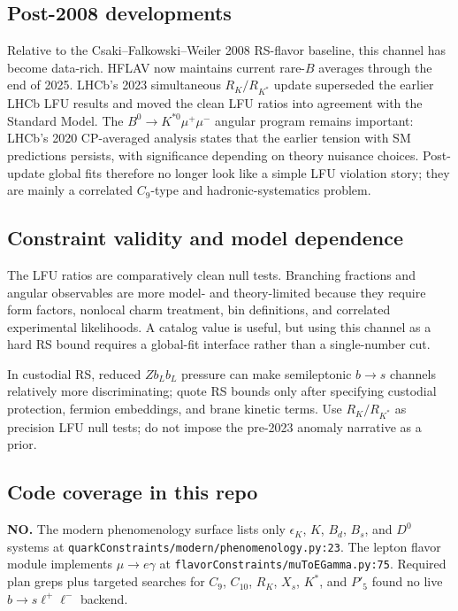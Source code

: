 \subsection*{Post-2008 developments}
Relative to the Csaki--Falkowski--Weiler 2008 RS-flavor baseline, this channel
has become data-rich.  HFLAV now maintains current rare-\(B\) averages through
the end of 2025.  LHCb's 2023 simultaneous \(R_K/R_{K^*}\) update superseded
the earlier LHCb LFU results and moved the clean LFU ratios into agreement with
the Standard Model.  The \(B^0\to K^{*0}\mu^+\mu^-\) angular program remains
important: LHCb's 2020 CP-averaged analysis states that the earlier tension
with SM predictions persists, with significance depending on theory nuisance
choices.  Post-update global fits therefore no longer look like a simple LFU
violation story; they are mainly a correlated \(C_9\)-type and
hadronic-systematics problem.

\subsection*{Constraint validity and model dependence}
The LFU ratios are comparatively clean null tests.  Branching fractions and
angular observables are more model- and theory-limited because they require
form factors, nonlocal charm treatment, bin definitions, and correlated
experimental likelihoods.  A catalog value is useful, but using this channel as
a hard RS bound requires a global-fit interface rather than a single-number
cut.

In custodial RS, reduced \(Z b_L b_L\) pressure can make semileptonic
\(b\to s\) channels relatively more discriminating; quote RS bounds only after
specifying custodial protection, fermion embeddings, and brane kinetic terms.
Use \(R_K/R_{K^*}\) as precision LFU null tests; do not impose the pre-2023
anomaly narrative as a prior.

\subsection*{Code coverage in this repo}
\textbf{NO.}  The modern phenomenology surface lists only
\(\epsilon_K\), \(K\), \(B_d\), \(B_s\), and \(D^0\) systems at
\texttt{quarkConstraints/modern/phenomenology.py:23}.  The lepton flavor module
implements \(\mu\to e\gamma\) at \texttt{flavorConstraints/muToEGamma.py:75}.
Required plan greps plus targeted searches for \(C_9\), \(C_{10}\), \(R_K\),
\(X_s\), \(K^*\), and \(P'_5\) found no live \(b\to s\ell^+\ell^-\) backend.

